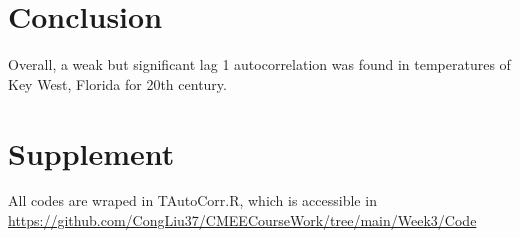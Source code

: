 \documentclass[12pt]{article}
\begin{document}
  \section{Conclusion}
  Overall, a weak but significant lag 1 autocorrelation was found in temperatures of Key West, Florida 
  for 20th century.

  \section{Supplement}
  All codes are wraped in TAutoCorr.R, which is accessible in 
  \newline
  \href{https://github.com/CongLiu37/CMEECourseWork/tree/main/Week3/Code}{https://github.com/CongLiu37/CMEECourseWork/tree/main/Week3/Code}
\end{document}
